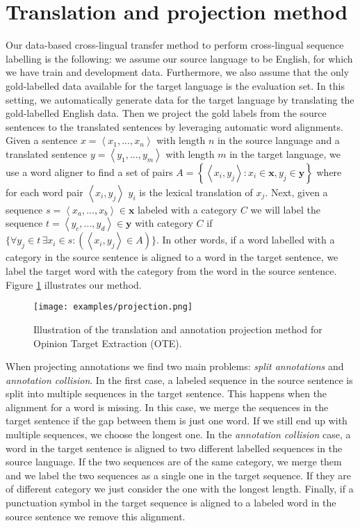 \documentclass[11pt]{article}
\begin{document}
\section{Translation and projection method}
\label{sec:Method}

Our data-based cross-lingual transfer method to perform cross-lingual sequence labelling is the following: we assume our source language to be English, for which we have train and development data. Furthermore, we also assume that the only gold-labelled data available for the target language is the evaluation set. In this setting, we automatically generate data for the target language by translating the gold-labelled English data. Then we project the gold labels from the source sentences to the translated sentences by leveraging automatic word alignments. Given a sentence  $x=\left\langle x_1,...,x_n  \right\rangle $  with length $n$ in the source language and a translated sentence    $y=\left\langle y_1,...,y_m \right\rangle$ with length $m$ in the target language,  we use a word aligner to find a set of pairs $A=\left\{\left\langle x_{i}, y_{j}\right\rangle: x_{i} \in \mathbf{x}, y_{j} \in \mathbf{y}\right\}$ where for each word pair $\left\langle x_i,y_j\right\rangle$ $y_i$ is the lexical translation of $x_j$. Next, given a sequence $s =\left\langle x_a,...,x_b  \right\rangle \in \mathbf{x}$  labeled with a category $C$ we will label the sequence $t =\left\langle y_c,...,y_d  \right\rangle \in \mathbf{y}$ with category $C$ if $\{ \forall y_j \in t \, \exists x_i \in  s : ( \left\langle x_i,y_j \right\rangle \in A )\}$. In other words, if a word labelled with a category in the source sentence is aligned to a word in the target sentence, we label the target word with the category from the word in the source sentence. Figure \ref{fig:DataExample} illustrates our method. 

\begin{figure}[t]
    \centering
    \texttt{[image: examples/projection.png]}
    \caption{Illustration of the translation and annotation projection method for Opinion Target Extraction (OTE).}
    \label{fig:DataExample}
\end{figure}

When projecting annotations we find two main problems: {\it split annotations} and {\it annotation collision}. In the first case, a labeled sequence in the source sentence is split into multiple sequences in the target sentence. This happens when the alignment for a word is missing. In this case, we merge the sequences in the target sentence if the gap between them is just one word. If we still end up with multiple sequences, we choose the longest one. In the {\it annotation collision} case, a word in the target sentence is aligned to two different labelled sequences in the source language. If the two sequences are of the same category, we merge them and we label the two sequences as a single one in the target sequence. If they are of different category we just consider the one with the longest length. Finally, if a punctuation symbol in the target sequence is aligned to a labeled word in the source sentence we remove this alignment.
\end{document}
